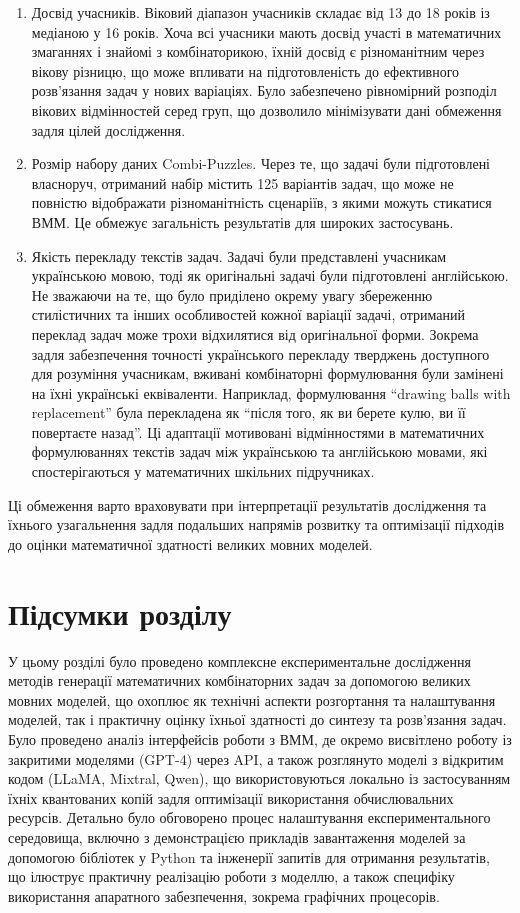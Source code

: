 \begin{enumerate}
    \item {Досвід учасників.} Віковий діапазон учасників складає від 13 до 18 років із медіаною у 16 років. Хоча всі учасники мають досвід участі в математичних змаганнях і знайомі з комбінаторикою, їхній досвід є різноманітним через вікову різницю, що може впливати на підготовленість до ефективного розв'язання задач у нових варіаціях. Було забезпечено рівномірний розподіл вікових відмінностей серед груп, що дозволило мінімізувати дані обмеження задля цілей дослідження.
    \item {Розмір набору даних Combi-Puzzles.} Через те, що задачі були підготовлені власноруч, отриманий набір містить 125 варіантів задач, що може не повністю відображати різноманітність сценаріїв, з якими можуть стикатися ВММ. Це обмежує загальність результатів для широких застосувань.
    \item {Якість перекладу текстів задач.} Задачі були представлені учасникам українською мовою, тоді як оригінальні задачі були підготовлені англійською. Не зважаючи на те, що було приділено окрему увагу збереженню стилістичних та інших особливостей кожної варіації задачі, отриманий переклад задач може трохи відхилятися від оригінальної форми. Зокрема задля забезпечення точності українського перекладу тверджень доступного для розуміння учасникам, вживані комбінаторні формулювання були замінені на їхні українські еквіваленти. Наприклад, формулювання ``drawing balls with replacement'' була перекладена як ``після того, як ви берете кулю, ви її повертаєте назад''. Ці адаптації мотивовані відмінностями в математичних формулюваннях текстів задач між українською та англійською мовами, які спостерігаються у математичних шкільних підручниках.
\end{enumerate}

Ці обмеження варто враховувати при інтерпретації результатів дослідження та їхнього узагальнення задля подальших напрямів розвитку та оптимізації підходів до оцінки математичної здатності великих мовних моделей.

\section{Підсумки розділу}
У цьому розділі було проведено комплексне експериментальне дослідження методів генерації математичних комбінаторних задач за допомогою великих мовних моделей, що охоплює як технічні аспекти розгортання та налаштування моделей, так і практичну оцінку їхньої здатності до синтезу та розв'язання задач. Було проведено аналіз інтерфейсів роботи з ВММ, де окремо висвітлено роботу із закритими моделями (GPT-4) через API, а також розглянуто моделі з відкритим кодом (LLaMA, Mixtral, Qwen), що використовуються локально із застосуванням їхніх квантованих копій задля оптимізації використання обчислювальних ресурсів. Детально було обговорено процес налаштування експериментального середовища, включно з демонстрацією прикладів завантаження моделей за допомогою бібліотек у Python та інженерії запитів для отримання результатів, що ілюструє практичну реалізацію роботи з моделлю, а також специфіку використання апаратного забезпечення, зокрема графічних процесорів. 


